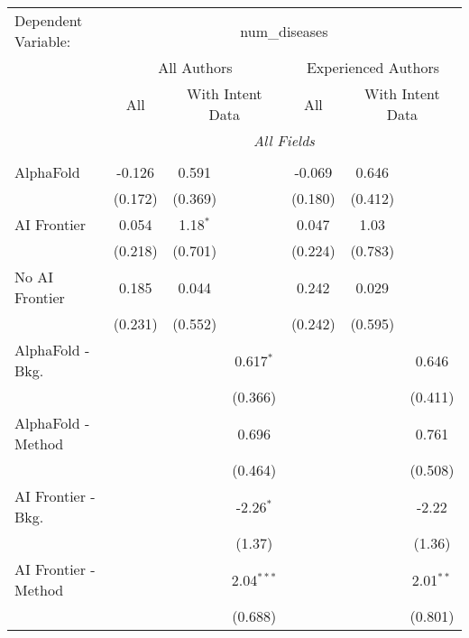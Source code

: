 \begingroup
\centering
\begin{tabular}{lcccccc}
   \tabularnewline \midrule \midrule
   Dependent Variable: & \multicolumn{6}{c}{num\_diseases}\\
 & \multicolumn{3}{c}{All Authors} & \multicolumn{3}{c}{Experienced Authors} \\
\cmidrule(lr){2-4} \cmidrule(lr){5-7}
 & \multicolumn{1}{c}{All} & \multicolumn{2}{c}{With Intent Data} & \multicolumn{1}{c}{All} & \multicolumn{2}{c}{With Intent Data} \\
\cmidrule(lr){2-2} \cmidrule(lr){3-4} \cmidrule(lr){5-5} \cmidrule(lr){6-7}
 & \multicolumn{6}{c}{\textit{All Fields}} \\ \\
   AlphaFold               & -0.126  & 0.591      &              & -0.069  & 0.646   &   \\   
                           & (0.172) & (0.369)    &              & (0.180) & (0.412) &   \\   
   AI Frontier             & 0.054   & 1.18$^{*}$ &              & 0.047   & 1.03    &   \\   
                           & (0.218) & (0.701)    &              & (0.224) & (0.783) &   \\   
   No AI Frontier          & 0.185   & 0.044      &              & 0.242   & 0.029   &   \\   
                           & (0.231) & (0.552)    &              & (0.242) & (0.595) &   \\   
   AlphaFold - Bkg.        &         &            & 0.617$^{*}$  &         &         & 0.646\\   
                           &         &            & (0.366)      &         &         & (0.411)\\   
   AlphaFold - Method      &         &            & 0.696        &         &         & 0.761\\   
                           &         &            & (0.464)      &         &         & (0.508)\\   
   AI Frontier - Bkg.      &         &            & -2.26$^{*}$  &         &         & -2.22\\   
                           &         &            & (1.37)       &         &         & (1.36)\\   
   AI Frontier - Method    &         &            & 2.04$^{***}$ &         &         & 2.01$^{**}$\\   
                           &         &            & (0.688)      &         &         & (0.801)\\   

\end{tabular}
